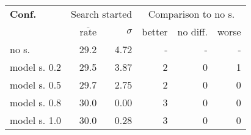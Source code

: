 \begin{tabular}{ l r r | r r r }
\hline 
\textbf{Conf.} & \multicolumn{2}{c|}{Search started} & \multicolumn{3}{c}{Comparison to no s.} \\ 
  & $\overline{\text{rate}}$ & $\sigma$ & better & no diff. & worse \\ 
\hline 
no s. & 29.2 & 4.72 & - & - & - \\ 
model s. 0.2 & 29.5 & 3.87 & 2 & 0 & 1 \\ 
model s. 0.5 & 29.7 & 2.75 & 2 & 0 & 0 \\ 
model s. 0.8 & 30.0 & 0.00 & 3 & 0 & 0 \\ 
model s. 1.0 & 30.0 & 0.28 & 3 & 0 & 0 \\ 
\hline 
\end{tabular}